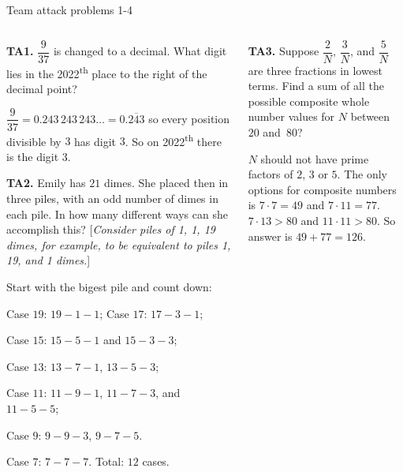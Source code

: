 \documentclass[9pt,aspectratio=169]{beamer}
\begin{document}
\begin{frame}{Team attack problems 1-4}
  \begin{columns}[T]
    \begin{column}{0.5\textwidth}
      \vspace*{-0.5\intextsep}
      \begin{problem}
        \textbf{TA1.} $\dfrac{9}{37}$ is changed to a decimal. What digit lies in the 2022\textsuperscript{th} place to the right of the decimal point?
      \end{problem}
      $\dfrac{9}{37} = 0.243\,243\,243\ldots = 0.\overline{243}$ so every position divisible by $3$ has digit $3$. So on 2022\textsuperscript{th} there is the digit $\boxed{3}$.

      \begin{problem}
        \textbf{TA2.} Emily has $21$ dimes. She placed then in three piles, with an odd number of dimes in each pile. In how many different ways can she accomplish this? [\emph{Consider piles of 1, 1, 19 dimes, for example, to be equivalent to piles 1, 19, and 1 dimes.}]
      \end{problem}
      Start with the bigest pile and count down:
      
      Case $19$: $19-1-1$;
      Case $17$: $17-3-1$;

      Case $15$: $15-5-1$ and $15-3-3$;

      Case $13$: $13-7-1$, $13-5-3$;

      Case $11$: $11-9-1$, $11-7-3$, and $11-5-5$;

      Case $9$: $9-9-3$, $9-7-5$.

      Case $7$: $7-7-7$.
      Total: $\boxed{12}$ cases.
    \end{column}
    \begin{column}{0.5\textwidth}
      \vspace*{-0.5\intextsep}
      \begin{problem}
        \textbf{TA3.} Suppose $\dfrac{2}{N}$, $\dfrac{3}{N}$, and $\dfrac{5}{N}$ are three fractions in lowest terms. Find a sum of all the possible composite whole number values for $N$ between $20$ and~$80$?
      \end{problem}
      $N$ should not have prime factors of $2$, $3$ or $5$. The only options for composite numbers is $7 \cdot 7=49$ and $7 \cdot 11=77$. $7 \cdot 13 > 80$ and $11 \cdot 11 > 80$. So answer is $49 + 77 = \boxed{126}$.


\end{column}
\end{columns}
\end{frame}
\end{document}
